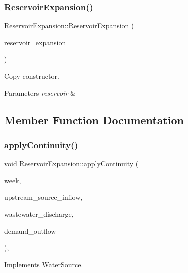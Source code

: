 \subsubsection{\texorpdfstring{Reservoir\+Expansion()}{ReservoirExpansion()}\hspace{0.1cm}{\footnotesize\ttfamily [2/2]}}
{\footnotesize\ttfamily Reservoir\+Expansion\+::\+Reservoir\+Expansion (\begin{DoxyParamCaption}\item[{const \mbox{\hyperlink{classReservoirExpansion}{Reservoir\+Expansion}} \&}]{reservoir\+\_\+expansion }\end{DoxyParamCaption})}

Copy constructor. 
\begin{DoxyParams}{Parameters}
{\em reservoir} & \\
\hline
\end{DoxyParams}


\subsection{Member Function Documentation}
\mbox{\label{classReservoirExpansion_a18614050354dced5cc2747eeda0c2397_a18614050354dced5cc2747eeda0c2397}} 
\subsubsection{\texorpdfstring{apply\+Continuity()}{applyContinuity()}}
{\footnotesize\ttfamily void Reservoir\+Expansion\+::apply\+Continuity (\begin{DoxyParamCaption}\item[{int}]{week,  }\item[{double}]{upstream\+\_\+source\+\_\+inflow,  }\item[{double}]{wastewater\+\_\+discharge,  }\item[{vector$<$ double $>$ \&}]{demand\+\_\+outflow }\end{DoxyParamCaption})\hspace{0.3cm}{\ttfamily [override]}, {\ttfamily [virtual]}}



Implements \mbox{\hyperlink{classWaterSource_ac070445379fe706f65b977dade4f3fbc_ac070445379fe706f65b977dade4f3fbc}{Water\+Source}}.

